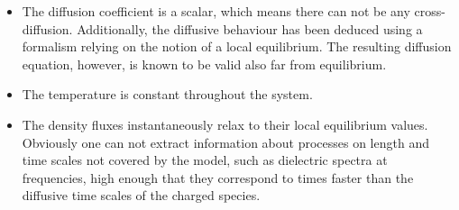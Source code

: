 \begin{itemize}
	\item The diffusion coefficient is a scalar, which means there can not be any
	cross-diffusion. Additionally, the diffusive behaviour has been deduced using
	a formalism relying on the notion of a local equilibrium. The resulting
	diffusion equation, however, is known to be valid also far from equilibrium.
	
	\item The temperature is constant throughout the system.
	
	\item The density fluxes instantaneously relax to their local equilibrium
	values. Obviously one can not extract information about processes on length
	and time scales not covered by the model, such as dielectric spectra at
	frequencies, high enough that they correspond to times faster than the
	diffusive time scales of the charged species.
\end{itemize}



